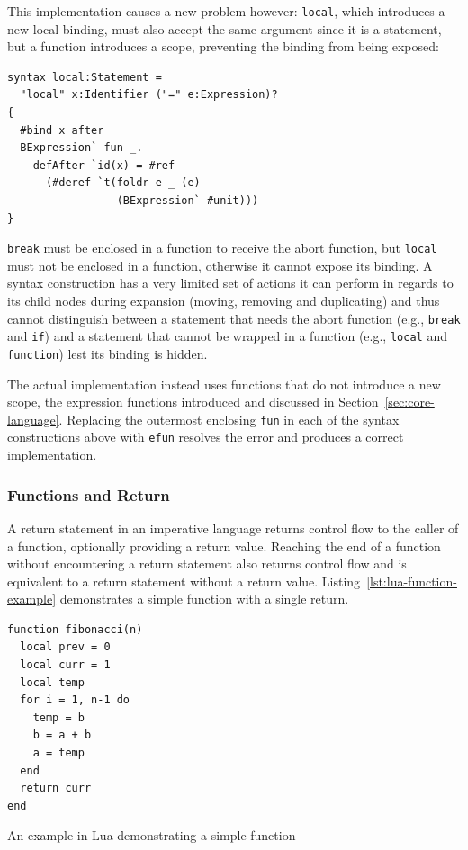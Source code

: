 \documentclass{kththesis}
\begin{document}
This implementation causes a new problem however: \texttt{local}, which introduces a new local binding, must also accept the same argument since it is a statement, but a function introduces a scope, preventing the binding from being exposed:

\begin{verbatim}
syntax local:Statement =
  "local" x:Identifier ("=" e:Expression)?
{
  #bind x after
  BExpression` fun _.
    defAfter `id(x) = #ref
      (#deref `t(foldr e _ (e)
                 (BExpression` #unit)))
}
\end{verbatim}

\texttt{break} must be enclosed in a function to receive the abort function, but \texttt{local} must not be enclosed in a function, otherwise it cannot expose its binding. A syntax construction has a very limited set of actions it can perform in regards to its child nodes during expansion (moving, removing and duplicating) and thus cannot distinguish between a statement that needs the abort function (e.g., \texttt{break} and \texttt{if}) and a statement that cannot be wrapped in a function (e.g., \texttt{local} and \texttt{function}) lest its binding is hidden.

The actual implementation instead uses functions that do not introduce a new scope, the expression functions introduced and discussed in Section~\ref{sec:core-language}. Replacing the outermost enclosing \texttt{fun} in each of the syntax constructions above with \texttt{efun} resolves the error and produces a correct implementation.

\subsubsection{Functions and Return}

A return statement in an imperative language returns control flow to the caller of a function, optionally providing a return value. Reaching the end of a function without encountering a return statement also returns control flow and is equivalent to a return statement without a return value. Listing~\ref{lst:lua-function-example} demonstrates a simple function with a single return.

\begin{listing}
\begin{verbatim}
function fibonacci(n)
  local prev = 0
  local curr = 1
  local temp
  for i = 1, n-1 do
    temp = b
    b = a + b
    a = temp
  end
  return curr
end
\end{verbatim}
\caption{An example in Lua demonstrating a simple function}
\label{lst:lua-function-example}
\end{listing}
\end{document}
